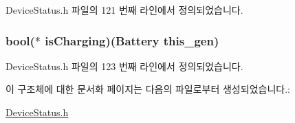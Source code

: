 Device\-Status.\-h 파일의 121 번째 라인에서 정의되었습니다.

\hypertarget{struct___battery_a58bd0a8a8a168cad5a323b2cef48f161}{
\subsubsection[{is\-Charging}]{\setlength{\rightskip}{0pt plus 5cm}bool($\ast$  is\-Charging)({\bf Battery} this\-\_\-gen)}}\label{struct___battery_a58bd0a8a8a168cad5a323b2cef48f161}


Device\-Status.\-h 파일의 123 번째 라인에서 정의되었습니다.



이 구조체에 대한 문서화 페이지는 다음의 파일로부터 생성되었습니다.\-:\begin{DoxyCompactItemize}
\item 
\hyperlink{_device_status_8h}{Device\-Status.\-h}\end{DoxyCompactItemize}
